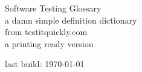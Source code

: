 \documentclass[a4paper, oneside, titlepage]{article}
\begin{document}
\thispagestyle{empty}
{\begingroup
\centering
\vfill
{\Huge Software Testing Glossary}\\[\baselineskip]
{\Large a damn simple definition dictionary}\\ [\baselineskip] 
{from testitquickly.com}\\ [\baselineskip]
{a printing ready version}\\ [\baselineskip] 

\vfill \null

last build: {\large\scshape \today}\par

\endgroup}

\newpage



\tableofcontents

\newpage

\pagestyle{plain}
\end{document}
